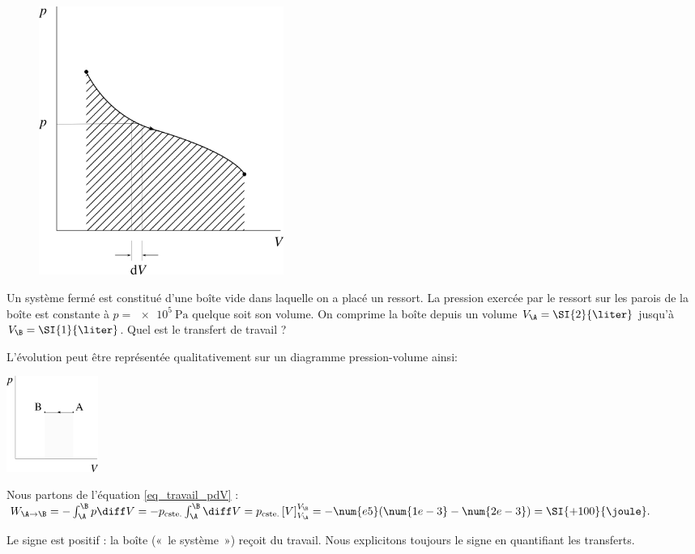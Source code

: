 		\begin{figure}
			\begin{center}
				\includegraphics[width=8cm]{images/pv_ressort.png}
			\end{center}
			\label{fig_p-v_ressort}
		\end{figure}

		\begin{anexample}
			
			Un système fermé est constitué d’une boîte vide dans laquelle on a placé un ressort. La pression exercée par le ressort sur les parois de la boîte est constante à $p = \SI{e5}{\pascal}$ quelque soit son volume. On comprime la boîte depuis un volume $V_\A = \SI{2}{\liter}$ jusqu’à $V_\B = \SI{1}{\liter}$. Quel est le transfert de travail ?
				\begin{answer}
						L’évolution peut être représentée qualitativement sur un diagramme pression-volume ainsi:
							\begin{center}
								\includegraphics[width=3cm]{images/ex_pv_isobare.png}
							\end{center}
					Nous partons de l’équation \ref{eq_travail_pdV} : $W_{\A\to\B} = - \int_\A^\B p \diff V = - p_\text{cste.} \int_\A^\B \diff V = p_\text{cste.} \left[V\right]_{V_\A}^{V_\B } = - \num{e5} (\num{1e-3} - \num{2e-3}) = \SI{+100}{\joule}.$
					\begin{remark}Le signe est positif : la boîte («~le système~») reçoit du travail. Nous explicitons toujours le signe en quantifiant les transferts.\end{remark}
				\end{answer}
		\end{anexample}


